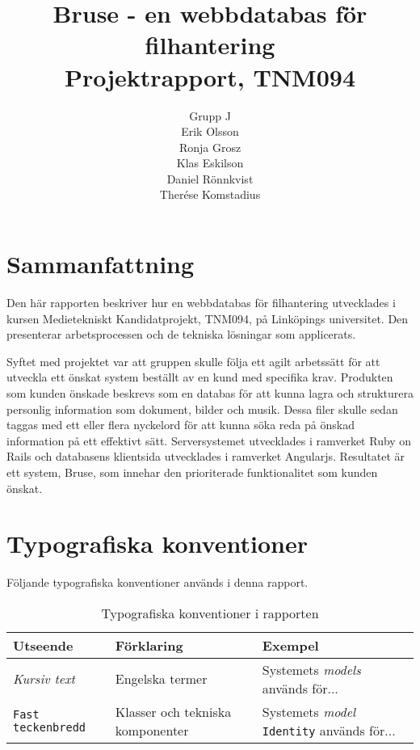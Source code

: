 \documentclass[a4paper,12pt,oneside,final]{extbook}
\title{Bruse - en webbdatabas för filhantering\\Projektrapport, TNM094}
\author{Grupp J\\Erik Olsson\\Ronja Grosz\\Klas Eskilson\\Daniel Rönnkvist\\Therése Komstadius}
\begin{document}
\pagestyle{empty}
\thispagestyle{empty}

\frontmatter

\maketitle

\pagestyle{fancy}

\chapter{Sammanfattning}
Den här rapporten beskriver hur en webbdatabas för filhantering utvecklades i kursen Medietekniskt Kandidatprojekt, TNM094, på Linköpings universitet. Den presenterar arbetsprocessen och de tekniska lösningar som applicerats.

Syftet med projektet var att gruppen skulle följa ett agilt arbetssätt för att utveckla ett önskat system beställt av en kund med specifika krav. Produkten som kunden önskade beskrevs som en databas för att kunna lagra och strukturera personlig information som dokument, bilder och musik. Dessa filer skulle sedan taggas med ett eller flera nyckelord för att kunna söka reda på önskad information på ett effektivt sätt. Serversystemet utvecklades i ramverket Ruby on Rails och databasens klientsida utvecklades i ramverket Angularjs. Resultatet är ett system, Bruse, som innehar den prioriterade funktionalitet som kunden önskat.

\tableofcontents

\cleardoublepage
{}
\listoffigures

\cleardoublepage
{}
\listoftables

\chapter{Typografiska konventioner}
Följande typografiska konventioner används i denna rapport.

\begin{table}[h]
  \begin{centering}
    \begin{tabular}{|l|l|l|}
    \hline
    \textbf{Utseende} & \textbf{Förklaring} & \textbf{Exempel} \\
    \hline
    \emph{Kursiv text} & Engelska termer & Systemets \emph{models} används för... \\
    \hline
    \texttt{Fast teckenbredd} & Klasser och tekniska komponenter & Systemets \emph{model} \texttt{Identity} används för... \\
    \hline
    \end{tabular}
    \caption[Table caption text]{Typografiska konventioner i rapporten}
    \label{table:type}
  \end{centering}
\end{table}
\end{document}
